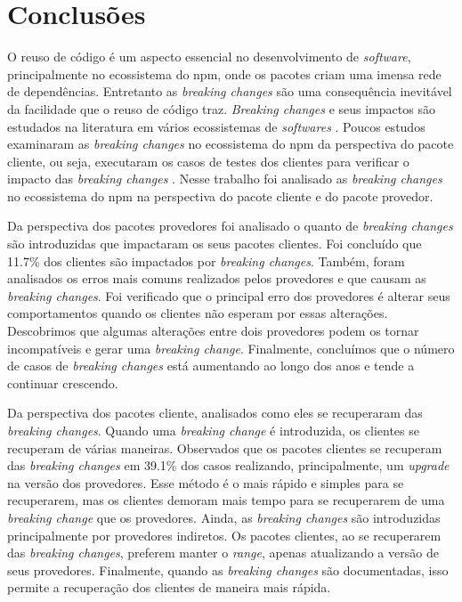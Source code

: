 \chapter{Conclusões}
\label{cap:conclusoes}

O reuso de código é um aspecto essencial no desenvolvimento de \textit{software}, principalmente no ecossistema do \textsf{npm}, onde os pacotes criam uma imensa rede de dependências. Entretanto as \textit{breaking changes} são uma consequência inevitável da facilidade que o reuso de código traz. \textit{Breaking changes} e seus impactos são estudados na literatura em vários ecossistemas de \textit{softwares} \cite{whyandhowluceneremovethiswords, intro:break_change, how_to_break_an_api, change_contracts}. Poucos estudos examinaram as \textit{breaking changes} no ecossistema do \textsf{npm} da perspectiva do pacote cliente, ou seja, executaram os casos de testes dos clientes para verificar o impacto das \textit{breaking changes} \cite{teorical_reference:bc_2, noregrets2018, using_others_tests}. Nesse trabalho foi analisado as \textit{breaking changes} no ecossistema do \textsf{npm} na perspectiva do pacote cliente e do pacote provedor.

Da perspectiva dos pacotes provedores foi analisado o quanto de \textit{breaking changes} são introduzidas que impactaram os seus pacotes clientes. Foi concluído que 11.7\% dos clientes são impactados por \textit{breaking changes}. Também, foram analisados os erros mais comuns realizados pelos provedores e que causam as \textit{breaking changes}. Foi verificado que o principal erro dos provedores é alterar seus comportamentos quando os clientes não esperam por essas alterações. Descobrimos que algumas alterações entre dois provedores podem os tornar incompatíveis e gerar uma \textit{breaking change}. Finalmente, concluímos que o número de casos de \textit{breaking changes} está aumentando ao longo dos anos e tende a continuar crescendo.

Da perspectiva dos pacotes cliente, analisados como eles se recuperaram das \textit{breaking changes}. Quando uma \textit{breaking change} é introduzida, os clientes se recuperam de várias maneiras. Observados que os pacotes clientes se recuperam das \textit{breaking changes} em 39.1\% dos casos realizando, principalmente, um \textit{upgrade} na versão dos provedores. Esse método é o mais rápido e simples para se recuperarem, mas os clientes demoram mais tempo para se recuperarem de uma \textit{breaking change} que os provedores. Ainda, as \textit{breaking changes} são introduzidas principalmente por provedores indiretos. Os pacotes clientes, ao se recuperarem das \textit{breaking changes}, preferem manter o \textit{range}, apenas atualizando a versão de seus provedores. Finalmente, quando as \textit{breaking changes} são documentadas, isso permite a recuperação dos clientes de maneira mais rápida.

